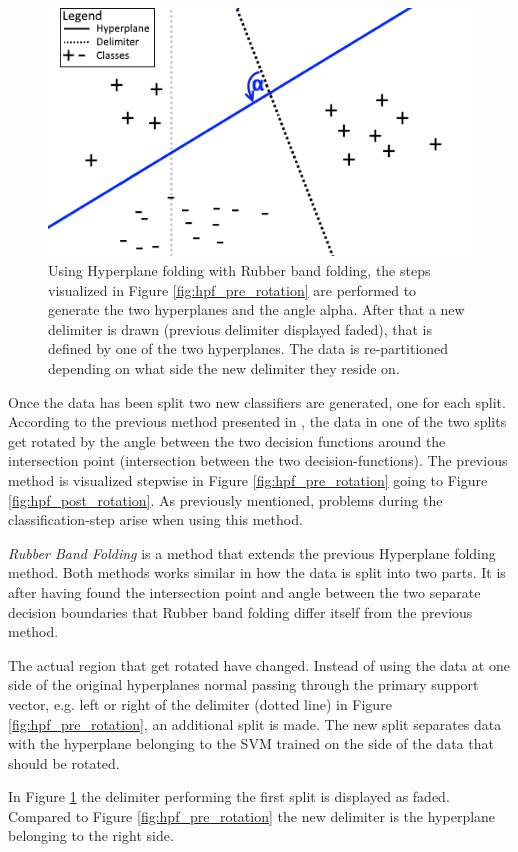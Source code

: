 \documentclass[a4paper,twoside]{bth}
\begin{document}
\begin{figure}
\centering
\includegraphics[scale=1]{images/intro-images/rubberbandExplanation1.png}

   \caption{Using Hyperplane folding with Rubber band folding, the steps visualized in Figure \ref{fig:hpf_pre_rotation} are performed to generate the two hyperplanes and the angle alpha. After that a new delimiter is drawn (previous delimiter displayed faded), that is defined by one of the two hyperplanes. The data is re-partitioned depending on what side the new delimiter they reside on.}
   \label{fig:rbf_pre_rotation}
\end{figure}


Once the data has been split two new classifiers are generated, one for each split. According to the previous method presented in \cite{unpublished}, the data in one of the two splits get rotated by the angle between the two decision functions around the intersection point (intersection between the two decision-functions). The previous method is visualized stepwise in Figure \ref{fig:hpf_pre_rotation} going to Figure \ref{fig:hpf_post_rotation}. As previously mentioned, problems during the classification-step arise when using this method.

\par \textit{Rubber Band Folding} is a method that extends the previous Hyperplane folding method. Both methods works similar in how the data is split into two parts. It is after having found the intersection point and angle between the two separate decision boundaries that Rubber band folding differ itself from the previous method.

\par The actual region that get rotated have changed. Instead of using the data at one side of the original hyperplanes normal passing through the primary support vector, e.g. left or right of the delimiter (dotted line) in Figure \ref{fig:hpf_pre_rotation}, an additional split is made. The new split separates data with the hyperplane belonging to the SVM trained on the side of the data that should be rotated. 
\par In Figure \ref{fig:rbf_pre_rotation} the delimiter performing the first split is displayed as faded. Compared to Figure \ref{fig:hpf_pre_rotation} the new delimiter is the hyperplane belonging to the right side.
\end{document}
